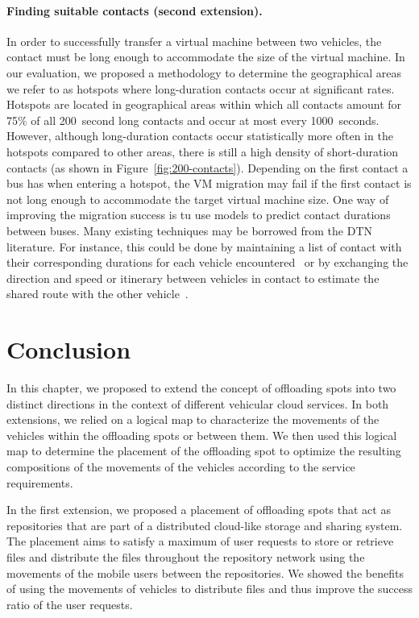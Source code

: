 \paragraph{Finding suitable contacts (second extension).} In order to successfully transfer a virtual machine between two vehicles, the contact must be long enough to accommodate the size of the virtual machine. In our evaluation, we proposed a methodology to determine the geographical areas we refer to as hotspots where long-duration contacts occur at significant rates. Hotspots are located in geographical areas within which all contacts amount for 75\% of all 200~second long contacts and occur at most every 1000~seconds. However, although long-duration contacts occur statistically more often in the hotspots compared to other areas, there is still a high density of short-duration contacts (as shown in Figure~\ref{fig:200-contacts}). Depending on the first contact a bus has when entering a hotspot, the VM migration may fail if the first contact is not long enough to accommodate the target virtual machine size. One way of improving the migration success is tu use models to predict contact durations between buses. Many existing techniques may be borrowed from the DTN literature. For instance, this could be done by maintaining a list of contact with their corresponding durations for each vehicle encountered~\cite{lindgren2003probabilistic,grossglauser2006locating} or by exchanging the direction and speed or itinerary between vehicles in contact to estimate the shared route with the other vehicle~\cite{cheng2010geodtn,banerjee2007energy}.

\section{Conclusion}

In this chapter, we proposed to extend the concept of offloading spots into two distinct directions in the context of different vehicular cloud services. In both extensions, we relied on a logical map to characterize the movements of the vehicles within the offloading spots or between them. We then used this logical map to determine the placement of the offloading spot to optimize the resulting compositions of the movements of the vehicles according to the service requirements.

In the first extension, we proposed a placement of offloading spots that act as repositories that are part of a distributed cloud-like storage and sharing system. The placement aims to satisfy a maximum of user requests to store or retrieve files and distribute the files throughout the repository network using the movements of the mobile users between the repositories. We showed the benefits of using the movements of vehicles to distribute files and thus improve the success ratio of the user requests.

